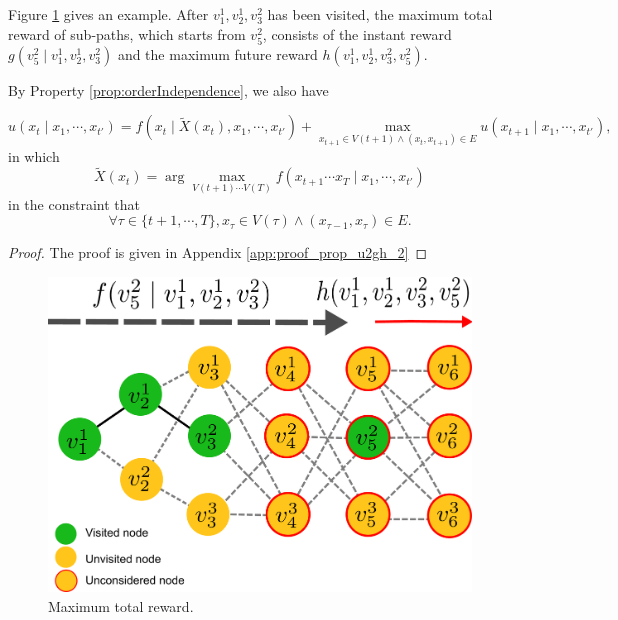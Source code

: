 Figure \ref{fig:DefineFuncP} gives an example.
After $ v^{1}_{1}, v^{1}_{2} , v^{2}_{3} $ has been visited, the maximum total reward of sub-paths, which starts from $ v^{2}_{5} $, consists of the instant reward $ g( v^{2}_{5} \mid v^{1}_{1}, v^{1}_{2} , v^{2}_{3} ) $ and the maximum future reward $ h( v^{1}_{1}, v^{1}_{2} , v^{2}_{3}, v^{2}_{5} ) $.

By Property \ref{prop:orderIndependence}, we also have
\begin{propty}
\label{prop:u2gh_2}
\begin{equation}
\label{eq:u2gh_2:0}
u( x_{t} \mid x_{1} , \cdots , x_{t'} ) = f( x_{t} \mid \tilde{X}(x_{t}), x_{1} , \cdots , x_{t'} ) +  \max_{x_{t+1} \in V(t+1) \land ( x_{t}, x_{t+1} ) \in E} u( x_{t+1} \mid x_{1} , \cdots , x_{t'} ),
\end{equation}
in which
\begin{equation}
\label{eq:u2gh_2:1}
\tilde{X}(x_{t}) = \arg \max_{ V(t+1) \cdots V(T) } f( x_{t+1} \cdots x_{T} \mid x_{1} , \cdots , x_{t'} )
\end{equation}
in the constraint that
\begin{equation}
\label{eq:u2gh_2:1:constraint}
\forall \tau \in \{ t+1 , \cdots , T \},  x_{ \tau } \in V( \tau ) \land ( x_{ \tau-1 }, x_{ \tau } ) \in E .
\end{equation}
\begin{proof}
The proof is given in Appendix \ref{app:proof_prop_u2gh_2}
\end{proof}
\end{propty}

\begin{figure}
\centering
\includegraphics[width=0.5\linewidth]{./images/DefineFuncP.pdf}
\caption{Maximum total reward.}
\label{fig:DefineFuncP}
\end{figure}

